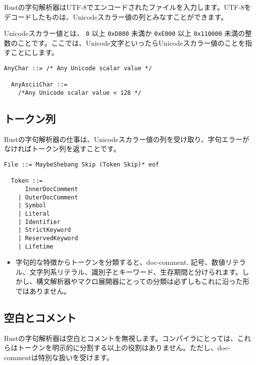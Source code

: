 \documentclass[dvipdfmx,uplatex,papersize,a4paper,10pt]{jsbook}
\theoremstyle{definition}
\begin{document}
Rustの字句解析器はUTF-8でエンコードされたファイルを入力します。UTF-8をデコードしたものは、Unicodeスカラー値の列とみなすことができます。

Unicodeスカラー値とは、 \verb|0| 以上 \verb|0xD800| 未満か \verb|0xE000| 以上 \verb|0x110000| 未満の整数のことです。ここでは、Unicode文字といったらUnicodeスカラー値のことを指すことにします。

\begin{lstlisting}[language=BNFLike, gobble=2]
  AnyChar ::= /* Any Unicode scalar value */

  AnyAsciiChar ::=
    /*Any Unicode scalar value < 128 */
\end{lstlisting}

\subsection{トークン列}

Rustの字句解析器の仕事は、Unicodeスカラー値の列を受け取り、字句エラーがなければトークン列を返すことです。

\begin{lstlisting}[language=BNFLike, gobble=2]
  File ::= MaybeShebang Skip (Token Skip)* eof

  Token ::=
      InnerDocComment
    | OuterDocComment
    | Symbol
    | Literal
    | Identifier
    | StrictKeyword
    | ReservedKeyword
    | Lifetime
\end{lstlisting}

\begin{itemize}
  \item 字句的な特徴からトークンを分類すると、doc-comment, 記号、数値リテラル、文字列系リテラル、識別子とキーワード、生存期間と分けられます。しかし、構文解析器やマクロ展開器にとっての分類は必ずしもこれに沿った形ではありません。
\end{itemize}

\subsection{空白とコメント}

Rustの字句解析器は空白とコメントを無視します。コンパイラにとっては、これらはトークンを明示的に分割する以上の役割はありません。ただし、doc-commentは特別な扱いを受けます。
\end{document}
